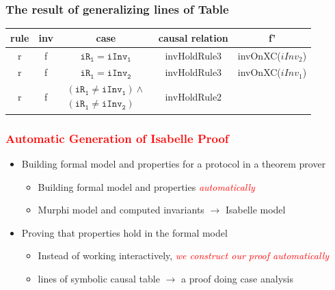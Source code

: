 \documentclass{beamer}
\def \eqc {= }
\def \iInv {iInv}
\def \iR {iR}
\newcommand\JP[1]{\textcolor{red}{#1}}
\begin{document}
\begin{frame}\frametitle{The result of generalizing lines of Table}
 \begin{table}[htbp]
\begin{tabular}{|c|c|c|c|c|  }
\hline
  rule&inv&case & causal relation &   f'  \\
\hline

  r& f& $\mathtt{\iR_1} \eqc \mathtt{\iInv_1}$ & invHoldRule3 &invOnXC($\iInv_2$) \\
\hline
  r &f& $\mathtt{\iR_1} \eqc \mathtt{\iInv_2}$ & invHoldRule3 &invOnXC($\iInv_1$)  \\
\hline
   r & f & $\left.
\begin{array}{c}
(\mathtt{\iR_1} \ne \mathtt{\iInv_1})\wedge \\
(\mathtt{\iR_1} \ne \mathtt{\iInv_2})
\end{array}%
\right. $ &invHoldRule2  & \\
\hline

\end{tabular}
\end{table}
\end{frame}

\begin{frame}\frametitle{\JP{Automatic Generation of Isabelle Proof}}

\begin{itemize}
\item Building formal model and  properties for a protocol  in a theorem prover

\begin{itemize}
\item Building formal model and  properties \JP{\emph{automatically}}

\item Murphi model and computed  invariants $\longrightarrow$  Isabelle model
\end{itemize}
\pause
\item Proving that properties hold in the formal model
\begin{itemize}
\item Instead of working interactively,\JP{\emph{ we construct our proof automatically}}

\item lines of symbolic causal table $\longrightarrow$ a proof doing case analysis
\end{itemize}
\end{itemize}
\end{frame}
\end{document}
